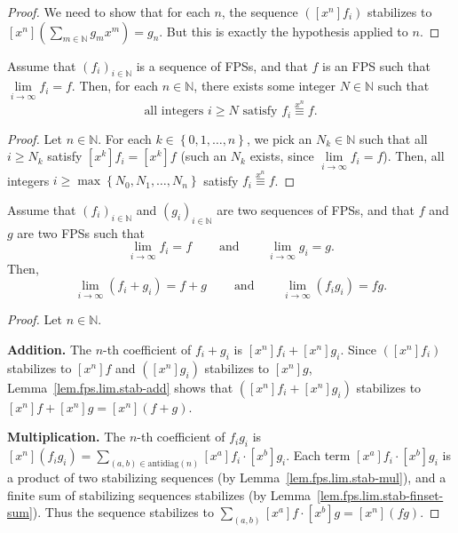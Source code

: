 \begin{proof}
\leanok
We need to show that for each $n$, the sequence $([x^n] f_i)$ stabilizes to
$[x^n](\sum_{m \in \mathbb{N}} g_m x^m) = g_n$. But this is exactly the
hypothesis applied to $n$.
\end{proof}

\begin{lemma}
\label{lem.fps.lim.xn-equiv}
\leantarget
\leanok
Assume that $\left(  f_{i}\right)  _{i\in
\mathbb{N}}$ is a sequence of FPSs, and that $f$ is an FPS such that
$\lim\limits_{i\rightarrow\infty}f_{i}=f$. Then, for each $n\in\mathbb{N}$,
there exists some integer $N\in\mathbb{N}$ such that
\[
\text{all integers }i\geq N\text{ satisfy }f_{i}\overset{x^{n}}{\equiv}f.
\]
\end{lemma}

\begin{proof}
\leanok
Let $n\in\mathbb{N}$.
For each $k\in\left\{  0,1,\ldots,n\right\}  $, we pick an $N_{k}\in
\mathbb{N}$ such that all $i\geq N_{k}$ satisfy $\left[  x^{k}\right]
f_{i}=\left[  x^{k}\right]  f$ (such an $N_{k}$ exists, since $\lim
\limits_{i\rightarrow\infty}f_{i}=f$). Then, all integers $i\geq\max\left\{
N_{0},N_{1},\ldots,N_{n}\right\}  $ satisfy $f_{i}\overset{x^{n}}{\equiv}f$.
\end{proof}

\begin{proposition}
\label{prop.fps.lim.sum-prod}
\leantarget
\leanok
Assume that $\left(  f_{i}\right)  _{i\in
\mathbb{N}}$ and $\left(  g_{i}\right)  _{i\in\mathbb{N}}$ are two sequences
of FPSs, and that $f$ and $g$ are two FPSs such that%
\[
\lim\limits_{i\rightarrow\infty}f_{i}=f\ \ \ \ \ \ \ \ \ \ \text{and}%
\ \ \ \ \ \ \ \ \ \ \lim\limits_{i\rightarrow\infty}g_{i}=g.
\]
Then,
\[
\lim\limits_{i\rightarrow\infty}\left(  f_{i}+g_{i}\right)
=f+g\ \ \ \ \ \ \ \ \ \ \text{and}\ \ \ \ \ \ \ \ \ \ \lim
\limits_{i\rightarrow\infty}\left(  f_{i}g_{i}\right)  =fg.
\]
\end{proposition}

\begin{proof}
\leanok
Let $n\in\mathbb{N}$.

\textbf{Addition.} The $n$-th coefficient of $f_i + g_i$ is
$[x^n]f_i + [x^n]g_i$. Since $([x^n]f_i)$ stabilizes to $[x^n]f$ and
$([x^n]g_i)$ stabilizes to $[x^n]g$, Lemma~\ref{lem.fps.lim.stab-add}
shows that $([x^n]f_i + [x^n]g_i)$ stabilizes to $[x^n]f + [x^n]g = [x^n](f+g)$.

\textbf{Multiplication.} The $n$-th coefficient of $f_i g_i$ is
$[x^n](f_i g_i) = \sum_{(a,b) \in \mathrm{antidiag}(n)} [x^a]f_i \cdot [x^b]g_i$.
Each term $[x^a]f_i \cdot [x^b]g_i$ is a product of two stabilizing sequences
(by Lemma~\ref{lem.fps.lim.stab-mul}), and a finite sum of stabilizing
sequences stabilizes (by Lemma~\ref{lem.fps.lim.stab-finset-sum}). Thus the
sequence stabilizes to $\sum_{(a,b)} [x^a]f \cdot [x^b]g = [x^n](fg)$.
\end{proof}

